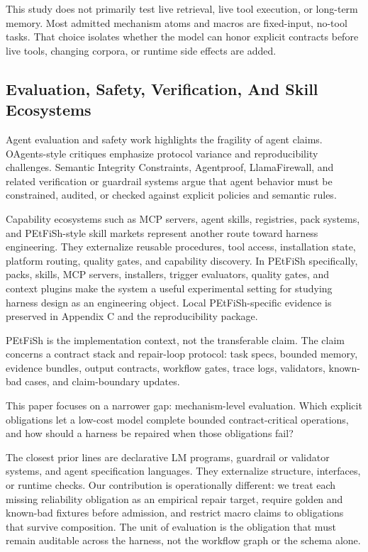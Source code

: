 \documentclass[11pt]{article}
\begin{document}
This study does not primarily test live retrieval, live tool execution, or long-term memory. Most admitted mechanism atoms and macros are fixed-input, no-tool tasks. That choice isolates whether the model can honor explicit contracts before live tools, changing corpora, or runtime side effects are added.

\subsection{Evaluation, Safety, Verification, And Skill Ecosystems}

Agent evaluation and safety work highlights the fragility of agent claims. OAgents-style critiques emphasize protocol variance and reproducibility challenges. Semantic Integrity Constraints, Agentproof, LlamaFirewall, and related verification or guardrail systems argue that agent behavior must be constrained, audited, or checked against explicit policies and semantic rules. \cite{P2_EXT_OAGENTS,P2_EXT_SIC,P2_EXT_AGENTPROOF,P2_EXT_LLAMAFIREWALL}

Capability ecosystems such as MCP servers, agent skills, registries, pack systems, and PEtFiSh-style skill markets represent another route toward harness engineering. They externalize reusable procedures, tool access, installation state, platform routing, quality gates, and capability discovery. In PEtFiSh specifically, packs, skills, MCP servers, installers, trigger evaluators, quality gates, and context plugins make the system a useful experimental setting for studying harness design as an engineering object. Local PEtFiSh-specific evidence is preserved in Appendix C and the reproducibility package.

PEtFiSh is the implementation context, not the transferable claim. The claim concerns a contract stack and repair-loop protocol: task specs, bounded memory, evidence bundles, output contracts, workflow gates, trace logs, validators, known-bad cases, and claim-boundary updates.

This paper focuses on a narrower gap: mechanism-level evaluation. Which explicit obligations let a low-cost model complete bounded contract-critical operations, and how should a harness be repaired when those obligations fail?

The closest prior lines are declarative LM programs, guardrail or validator systems, and agent specification languages. They externalize structure, interfaces, or runtime checks. Our contribution is operationally different: we treat each missing reliability obligation as an empirical repair target, require golden and known-bad fixtures before admission, and restrict macro claims to obligations that survive composition. The unit of evaluation is the obligation that must remain auditable across the harness, not the workflow graph or the schema alone.
\end{document}
